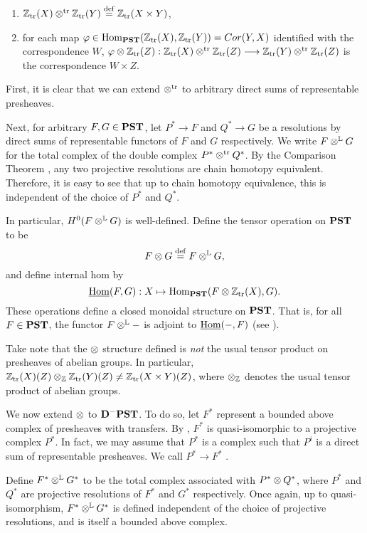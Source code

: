 \begin{enumerate}
\item $\Ztr(X) \ttr \Ztr(Y) \defeq \Ztr(X \times Y)$, 

\item for each map $\phi \in \hom_{\PST}(\Ztr(X), \Ztr(Y)) = 
\Cor(Y, X)$ identified with the correspondence $W$, $\phi \tensor 
\Ztr(Z): \Ztr(X) \ttr \Ztr(Z) \to \Ztr(Y) \ttr \Ztr(Z)$ is the
correspondence $W \times Z$. 
\end{enumerate}

First, it is clear that we can extend $\ttr$ to arbitrary 
direct sums of representable presheaves.  

Next, for arbitrary $F, G \in \PST$, let $P^* \to F$ and $Q^* \to G$
be a resolutions by direct sums of representable functors of $F$ 
and $G$ respectively. We write $F \tL G$ for the total complex of 
the double complex $P^* \ttr Q^*$. By the Comparison Theorem 
\cite[Theorem 2.26]{WH}, any two projective resolutions are chain 
homotopy equivalent. Therefore, it is easy to see that up to chain 
homotopy equivalence, this is independent of the choice of $P^*$ 
and $Q^*$.

In particular, $H^0(F \tL G)$ is well-defined. Define the tensor 
operation on $\PST$ to be
\[
F \tensor G \defeq F \tL G,
\]
and define internal hom by
\[
\ihom(F, G): X \mapsto \hom_{\PST}(F \tensor \Ztr(X), G).
\]
These operations define a closed monoidal structure on $\PST$.
That is, for all $F \in \PST$, the functor $F \tL -$ is adjoint to 
$\ihom(-, F)$ (see \cite[Lemma 8.3]{MVW}).

\begin{rmk}
Take note that the $\tensor$ structure defined is \emph{not} the
usual tensor product on presheaves of abelian groups. In 
particular, $\Ztr(X)(Z) \tensor_{\Z} \Ztr(Y)(Z) \neq 
\Ztr(X \times Y)(Z)$, where $\tensor_{\Z}$ denotes the usual 
tensor product of abelian groups.
\end{rmk}

We now extend $\tensor$ to $\DCat[D]^-\PST$. To do so, let $F^*$ 
represent a bounded above complex of presheaves with transfers.
By \cite[10.5.6]{WH}, $F^*$ is quasi-isomorphic to a projective 
complex $P^*$. In fact, we may assume that $P^*$ is a complex such 
that $P^i$ is a direct sum of representable presheaves. We call 
$P^* \to F^*$ .

Define $F^* \tL G^*$ to be the total complex associated with
$P^* \tensor Q^*$, where $P^*$ and $Q^*$ are projective 
resolutions of $F^*$ and $G^*$ respectively. Once again, up to
quasi-isomorphism, $F^* \tL G^*$ is defined independent of the 
choice of projective resolutions, and is itself a bounded above 
complex. 

